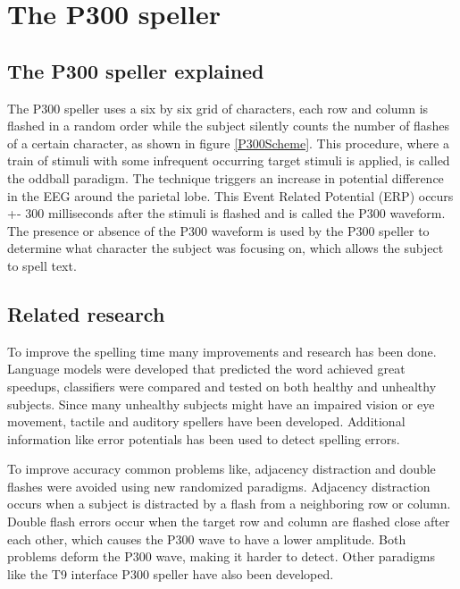 \section{The P300 speller}
\subsection{The P300 speller explained}
The P300 speller uses a six by six grid of characters, each row and column is flashed in a random order while the subject silently counts the number of flashes of a certain character, as shown in figure \ref{P300Scheme}. This procedure, where a train of stimuli with some infrequent occurring target stimuli is applied, is called the oddball paradigm. The technique triggers an increase in potential difference in the EEG around the parietal lobe. This Event Related Potential (ERP) occurs +- 300 milliseconds after the stimuli is flashed and is called the P300 waveform\cite{ComparisonClassifications}. The presence or absence of the P300 waveform is used by the P300 speller to determine what character the subject was focusing on, which allows the subject to spell text. 


\subsection{Related research}
To improve the spelling time many improvements and research has been done. Language models were developed that predicted the word achieved great speedups\cite{LangModel}, classifiers were compared and tested on both healthy\cite{ClassTechniqueComp} and unhealthy subjects\cite{ComparisonClassifications}. Since many unhealthy subjects might have an impaired vision or eye movement, tactile\cite{TactileP300} and auditory\cite{AuditoryP300} spellers have been developed. Additional information like error potentials has been used to detect spelling errors\cite{ErrorPotentials}. 

\npar

To improve accuracy common problems like, adjacency distraction and double flashes were avoided using new randomized paradigms\cite{PaperThibault}. Adjacency distraction occurs when a subject is distracted by a flash from a neighboring row or column. Double flash errors occur when the target row and column are flashed close after each other, which causes the P300 wave to have a lower amplitude. Both problems deform the P300 wave, making it harder to detect. Other paradigms like the T9 interface P300 speller have also been developed\cite{P300T9}.

